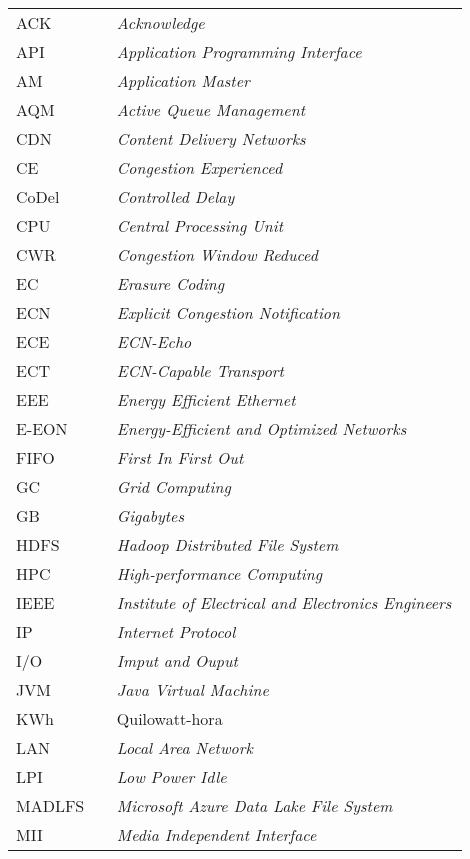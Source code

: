 

\begin{listaacron}

\begin{longtable}[l]{p{0.2\linewidth}p{0.7\linewidth}}
ACK & \emph{Acknowledge}\\
API & \emph{Application Programming Interface}\\
AM & \emph{Application Master}\\
AQM & \emph{Active Queue Management}\\
CDN & \emph{Content Delivery Networks}\\
CE & \emph{Congestion Experienced}\\
CoDel & \emph{Controlled Delay}\\
CPU & \emph{Central Processing Unit}\\
CWR & \emph{Congestion Window Reduced}\\
EC & \emph{Erasure Coding}\\
ECN & \emph{Explicit Congestion Notification}\\
ECE & \emph{ECN-Echo}\\
ECT & \emph{ECN-Capable Transport}\\
EEE & \emph{Energy Efficient Ethernet}\\
E-EON & \emph{Energy-Efficient and Optimized Networks}\\
FIFO & \emph{First In First Out}\\
GC & \emph{Grid Computing}\\
GB & \emph{Gigabytes}\\
HDFS & \emph{Hadoop Distributed File System}\\
HPC & \emph{High-performance Computing}\\
IEEE &  \emph{Institute of Electrical and Electronics Engineers}\\
IP & \emph{Internet Protocol}\\
I/O & \emph{Imput and Ouput}\\
JVM & \emph{Java Virtual Machine}\\
KWh & Quilowatt-hora\\
LAN & \emph{Local Area Network}\\
LPI & \emph{Low Power Idle}\\
MADLFS & \emph{Microsoft Azure Data Lake File System}\\
MII & \emph{Media Independent Interface}\\

\end{longtable}
\end{listaacron}
